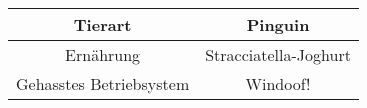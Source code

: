 \documentclass[50pt, a4paper]{article}
\begin{document}
\begin{center}
    
\begin{tabular}{ | c | c | }
\hline
Tierart & Pinguin  \\
\hline
Ernährung & Stracciatella-Joghurt \\
\hline
Gehasstes Betriebsystem & Windoof! \\
\hline

\end{tabular}

    
\end{center}
\end{document}

